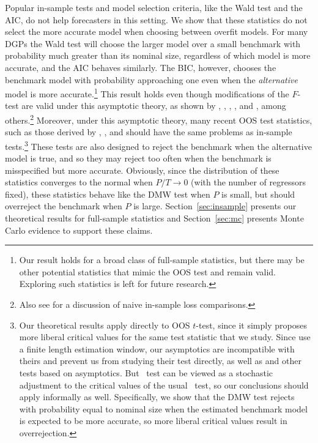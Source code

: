 \documentclass[12pt,draft]{article}
\begin{document}
Popular in-sample tests and model selection criteria, like the Wald
test and the AIC, do not help forecasters in this setting. We show
that these statistics do not select the more accurate model when
choosing between overfit models. For many DGPs the Wald test
will choose the larger model over a small benchmark
with probability much greater than its nominal size, regardless of
which model is more accurate, and the AIC behaves similarly. The BIC,
however, chooses the benchmark model with probability approaching one
even when the \emph{alternative} model is more accurate.\footnote{%
  Our result holds for a broad class of full-sample statistics, but
  there may be other potential statistics that mimic the OOS test and
  remain valid. Exploring such statistics is left for future
  research.} %
This result holds even though modifications of the $F$-test are valid
under this asymptotic theory, as shown by \citet{BoB:95},
\citet{AkA:00}, \citet{AkP:04}, \citet{Cal:11c}, and \citet{Ana:12},
among others.\footnote{%
  Also see \citet{Efr:86,Efr:04} for a discussion of naive in-sample
  loss comparisons.} %
Moreover, under this asymptotic theory, many recent OOS test
statistics, such as those derived by \cite{ClM:01,ClM:05},
\citet{Mcc:07}, and \citet{ClW:06,ClW:07} should have the same
problems as in-sample tests.\footnote{%
  Our theoretical results apply directly to  OOS
  $t$-test, since it simply proposes more liberal critical values for
  the same test statistic that we study.  Since \citet{ClW:06,ClW:07}
  use a finite length estimation window, our asymptotics are
  incompatible with theirs and prevent us from studying their test
  directly, as well as  and other tests based on
   asymptotics.  But \clws\ test can be viewed as a
  stochastic adjustment to the critical values of the usual \oost\
  test, so our conclusions should apply informally as well.
  Specifically, we show that the DMW test rejects with probability
  equal to nominal size when the estimated benchmark model is expected
  to be more accurate, so more liberal critical values result in
  overrejection.} %
These tests are also designed to reject the benchmark when the
alternative model is true, and so they may reject too often when the
benchmark is misspecified but more accurate.  Obviously, since the
distribution of these statistics converges to the normal when $P/T \to
0$ (with the number of regressors fixed), these statistics behave like
the DMW test when $P$ is small, but should overreject the benchmark
when $P$ is large. Section~\ref{sec:insample} presents our theoretical
results for full-sample statistics and Section~\ref{sec:mc} presents
Monte Carlo evidence to support these claims.
\end{document}
